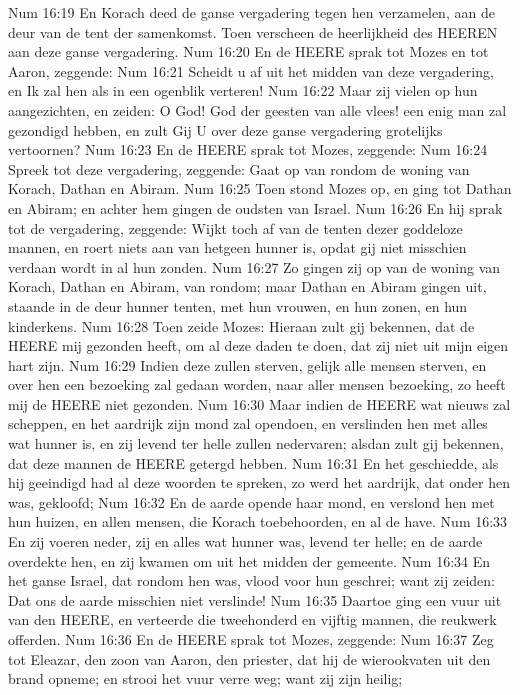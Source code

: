 Num 16:19  En Korach deed de ganse vergadering tegen hen verzamelen, aan de deur van de tent der samenkomst. Toen verscheen de heerlijkheid des HEEREN aan deze ganse vergadering.
Num 16:20  En de HEERE sprak tot Mozes en tot Aaron, zeggende:
Num 16:21  Scheidt u af uit het midden van deze vergadering, en Ik zal hen als in een ogenblik verteren!
Num 16:22  Maar zij vielen op hun aangezichten, en zeiden: O God! God der geesten van alle vlees! een enig man zal gezondigd hebben, en zult Gij U over deze ganse vergadering grotelijks vertoornen?
Num 16:23  En de HEERE sprak tot Mozes, zeggende:
Num 16:24  Spreek tot deze vergadering, zeggende: Gaat op van rondom de woning van Korach, Dathan en Abiram.
Num 16:25  Toen stond Mozes op, en ging tot Dathan en Abiram; en achter hem gingen de oudsten van Israel.
Num 16:26  En hij sprak tot de vergadering, zeggende: Wijkt toch af van de tenten dezer goddeloze mannen, en roert niets aan van hetgeen hunner is, opdat gij niet misschien verdaan wordt in al hun zonden.
Num 16:27  Zo gingen zij op van de woning van Korach, Dathan en Abiram, van rondom; maar Dathan en Abiram gingen uit, staande in de deur hunner tenten, met hun vrouwen, en hun zonen, en hun kinderkens.
Num 16:28  Toen zeide Mozes: Hieraan zult gij bekennen, dat de HEERE mij gezonden heeft, om al deze daden te doen, dat zij niet uit mijn eigen hart zijn.
Num 16:29  Indien deze zullen sterven, gelijk alle mensen sterven, en over hen een bezoeking zal gedaan worden, naar aller mensen bezoeking, zo heeft mij de HEERE niet gezonden.
Num 16:30  Maar indien de HEERE wat nieuws zal scheppen, en het aardrijk zijn mond zal opendoen, en verslinden hen met alles wat hunner is, en zij levend ter helle zullen nedervaren; alsdan zult gij bekennen, dat deze mannen de HEERE getergd hebben.
Num 16:31  En het geschiedde, als hij geeindigd had al deze woorden te spreken, zo werd het aardrijk, dat onder hen was, gekloofd;
Num 16:32  En de aarde opende haar mond, en verslond hen met hun huizen, en allen mensen, die Korach toebehoorden, en al de have.
Num 16:33  En zij voeren neder, zij en alles wat hunner was, levend ter helle; en de aarde overdekte hen, en zij kwamen om uit het midden der gemeente.
Num 16:34  En het ganse Israel, dat rondom hen was, vlood voor hun geschrei; want zij zeiden: Dat ons de aarde misschien niet verslinde!
Num 16:35  Daartoe ging een vuur uit van den HEERE, en verteerde die tweehonderd en vijftig mannen, die reukwerk offerden.
Num 16:36  En de HEERE sprak tot Mozes, zeggende:
Num 16:37  Zeg tot Eleazar, den zoon van Aaron, den priester, dat hij de wierookvaten uit den brand opneme; en strooi het vuur verre weg; want zij zijn heilig;
